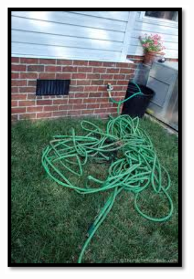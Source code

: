 \documentclass{beamer}
\begin{document}
\begin{frame}
\begin{columns}
\begin{column}{0.3\textwidth}
          \begin{figure}
            \centering
            \includegraphics[width=1.00\textwidth]{img/hose.png}
            \label{fig:hose}
          \end{figure}

        \end{column}
        \begin{column}{0.3\textwidth}


\end{column}
\end{columns}
\end{frame}
\end{document}
